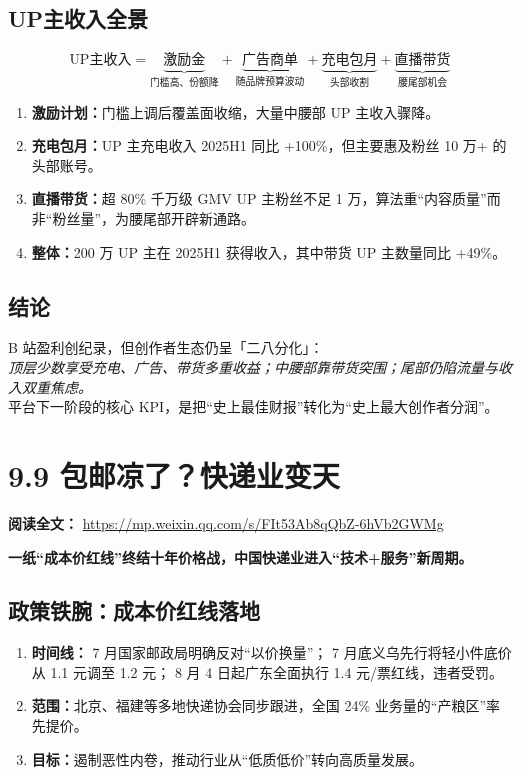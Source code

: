 \subsection{UP主收入全景}
\[
\text{UP主收入} = \underbrace{\text{激励金}}_{\text{门槛高、份额降}} + \underbrace{\text{广告商单}}_{\text{随品牌预算波动}} + \underbrace{\text{充电包月}}_{\text{头部收割}} + \underbrace{\text{直播带货}}_{\text{腰尾部机会}}
\]

\begin{enumerate}[leftmargin=*, nosep]
    \item \textbf{激励计划：}门槛上调后覆盖面收缩，大量中腰部 UP 主收入骤降。
    \item \textbf{充电包月：}UP 主充电收入 2025H1 同比 +100\%，但主要惠及粉丝 10 万+ 的头部账号。
    \item \textbf{直播带货：}超 80\% 千万级 GMV UP 主粉丝不足 1 万，算法重“内容质量”而非“粉丝量”，为腰尾部开辟新通路。
    \item \textbf{整体：}200 万 UP 主在 2025H1 获得收入，其中带货 UP 主数量同比 +49\%。
\end{enumerate}

\subsection{结论}
B 站盈利创纪录，但创作者生态仍呈「二八分化」：\\
\emph{顶层少数享受充电、广告、带货多重收益；中腰部靠带货突围；尾部仍陷流量与收入双重焦虑。}\\
平台下一阶段的核心 KPI，是把“史上最佳财报”转化为“史上最大创作者分润”。


\section{9.9 包邮凉了？快递业变天}
\vspace{1em}
\noindent\textbf{阅读全文：} \url{https://mp.weixin.qq.com/s/FIt53Ab8qQbZ-6hVb2GWMg}

\textbf{一纸“成本价红线”终结十年价格战，中国快递业进入“技术+服务”新周期。}
\subsection{政策铁腕：成本价红线落地}
\begin{enumerate}[leftmargin=*, nosep]
  \item \textbf{时间线：}  
        7 月国家邮政局明确反对“以价换量”；  
        7 月底义乌先行将轻小件底价从 1.1 元调至 1.2 元；  
        8 月 4 日起广东全面执行 1.4 元/票红线，违者受罚。
  \item \textbf{范围：}北京、福建等多地快递协会同步跟进，全国 24\% 业务量的“产粮区”率先提价。
  \item \textbf{目标：}遏制恶性内卷，推动行业从“低质低价”转向高质量发展。
\end{enumerate}

